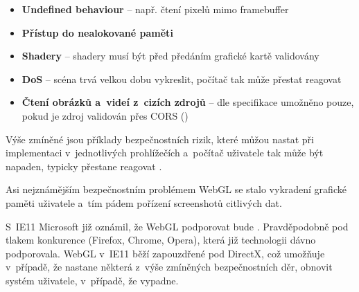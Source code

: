 \documentclass[12pt,a4paper,titlepage,final]{report}
\begin{document}
\begin{itemize}
	\item \textbf{Undefined behaviour} -- např. čtení pixelů mimo framebuffer
	\item \textbf{Přístup do nealokované paměti}
	\item \textbf{Shadery} -- shadery musí být před předáním grafické kartě validovány
	\item \textbf{DoS} -- scéna trvá velkou dobu vykreslit, počítač tak může přestat reagovat
	\item \textbf{Čtení obrázků a~videí z~cizích zdrojů} -- dle specifikace umožněno pouze, pokud je zdroj validován přes CORS (\cite{cors})
\end{itemize}

Výše zmíněné jsou příklady bezpečnostních rizik, které můžou nastat při implementaci v~jednotlivých prohlížečích a~počítač uživatele tak může být napaden, typicky přestane reagovat \cite{security}.

Asi nejznámějším bezpečnostním problémem WebGL se stalo vykradení grafické paměti uživatele \cite{gstealing} a~tím pádem pořízení screenshotů citlivých dat.

S~IE11 Microsoft již oznámil, že WebGL podporovat bude \cite{ie11}. Pravděpodobně pod tlakem konkurence (Firefox, Chrome, Opera), která již technologii dávno podporovala. WebGL v~IE11 běží zapouzdřené pod DirectX, což umožňuje v~případě, že nastane některá z~výše zmíněných bezpečnostních děr, obnovit systém uživatele, v~případě, že vypadne.
	



\nocite{comparison}
\nocite{comparison2d}
\nocite{comparison-book}
\nocite{choose-api}
\nocite{engines}


\hypertarget{bib}{}

\end{document}
